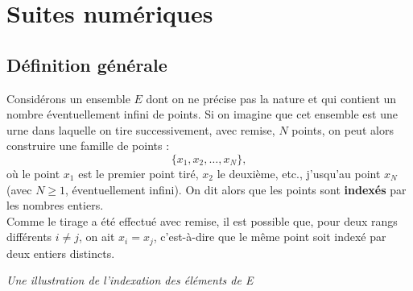 \documentclass[a4paper, 12pt]{report}
\begin{document}
\chapter{Suites numériques}

\section{Définition générale}

Considérons un ensemble $E$ dont on ne précise pas la nature et qui contient un nombre éventuellement infini de points. Si on imagine que cet ensemble est une urne dans laquelle on tire successivement, avec remise, $N$ points, on peut alors construire une famille de points :
\[ \{x_1, x_2, \dots, x_N \}, \]
où le point $x_1$ est le premier point tiré, $x_2$ le deuxième, etc., j'usqu'au point $x_N$ (avec $N \geq 1$, éventuellement infini). On dit alors que les points sont \textbf{indexés} par les nombres entiers. \\
Comme le tirage a été effectué avec remise, il est possible que, pour deux rangs différents $i \neq j$, on ait $x_i = x_j$, c'est-à-dire que le même point soit indexé par deux entiers distincts. \\

\begin{center}


\textit{Une illustration de l'indexation des éléments de E}

\end{center}
\end{document}
